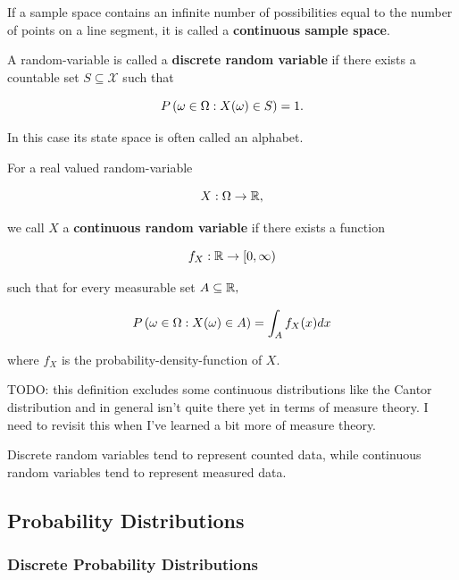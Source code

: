 \documentclass{article}
\begin{document}
\begin{definition}
If a \@{sample space} contains an infinite number of possibilities equal to the number of points on a line segment, it is called a \textbf{continuous sample space}.
\end{definition}

\begin{definition}
	A \@{random-variable} is called a \textbf{discrete random variable} if there exists a \@{countable} \@{set} $S \subseteq \mathcal{X}$ such that

\[ P \left(\omega \in \Omega : X(\omega) \in S\right) = 1. \]

In this case its state space is often called an alphabet.
\end{definition}

\begin{definition}
	For a \@{real} valued \@{random-variable}

	\[ X : \Omega \to \mathbb{R}, \]

	we call $X$ a \textbf{continuous random variable} if there exists a \@{function}

	\[ f_X : \mathbb{R} \to [0, \infty) \]

	such that for every \@{measurable} set $A \subseteq \mathbb{R},$

	\[ P \left(\omega \in \Omega : X(\omega) \in A\right) = \int_{A}{f_X(x) dx} \]

	where $f_X$ is the \@{probability-density-function} of $X.$

	TODO: this definition excludes some continuous distributions like the Cantor distribution and in general isn't quite there yet in terms of measure theory. I need to revisit this when I've learned a bit more of measure theory.
\end{definition}

\@{Discrete random variables} tend to represent counted data, while \@{continuous random variables} tend to represent measured data.

\subsection{Probability Distributions}

\subsubsection{Discrete Probability Distributions}
\end{document}

